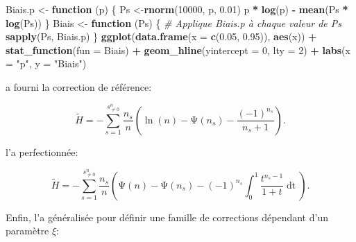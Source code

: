 \documentclass[
  11pt,
  french,
  a4paper,
  extrafontsizes,onecolumn,openright
  ]{memoir}
\newenvironment{Shaded}{\begin{snugshade}}{\end{snugshade}}
\newcommand{\AttributeTok}[1]{\textcolor[rgb]{0.13,0.29,0.53}{#1}}
\newcommand{\CommentTok}[1]{\textcolor[rgb]{0.56,0.35,0.01}{\textit{#1}}}
\newcommand{\ControlFlowTok}[1]{\textcolor[rgb]{0.13,0.29,0.53}{\textbf{#1}}}
\newcommand{\DecValTok}[1]{\textcolor[rgb]{0.00,0.00,0.81}{#1}}
\newcommand{\FloatTok}[1]{\textcolor[rgb]{0.00,0.00,0.81}{#1}}
\newcommand{\FunctionTok}[1]{\textcolor[rgb]{0.13,0.29,0.53}{\textbf{#1}}}
\newcommand{\NormalTok}[1]{#1}
\newcommand{\OtherTok}[1]{\textcolor[rgb]{0.56,0.35,0.01}{#1}}
\newcommand{\SpecialCharTok}[1]{\textcolor[rgb]{0.81,0.36,0.00}{\textbf{#1}}}
\newcommand{\StringTok}[1]{\textcolor[rgb]{0.31,0.60,0.02}{#1}}
\newlength{\rf}
\begin{document}
\begin{Shaded}
\begin{Highlighting}[]
\NormalTok{Biais.p }\OtherTok{\textless{}{-}} \ControlFlowTok{function}\NormalTok{ (p) \{}
\NormalTok{    Ps }\OtherTok{\textless{}{-}}\FunctionTok{rnorm}\NormalTok{(}\DecValTok{10000}\NormalTok{, p, }\FloatTok{0.01}\NormalTok{)}
\NormalTok{    p }\SpecialCharTok{*} \FunctionTok{log}\NormalTok{(p) }\SpecialCharTok{{-}} \FunctionTok{mean}\NormalTok{(Ps }\SpecialCharTok{*} \FunctionTok{log}\NormalTok{(Ps))}
\NormalTok{  \}}
\NormalTok{  Biais }\OtherTok{\textless{}{-}} \ControlFlowTok{function}\NormalTok{ (Ps) \{}
    \CommentTok{\# Applique Biais.p à chaque valeur de Ps}
    \FunctionTok{sapply}\NormalTok{(Ps, Biais.p)}
\NormalTok{  \}}
  \FunctionTok{ggplot}\NormalTok{(}\FunctionTok{data.frame}\NormalTok{(}\AttributeTok{x =} \FunctionTok{c}\NormalTok{(}\FloatTok{0.05}\NormalTok{, }\FloatTok{0.95}\NormalTok{)), }\FunctionTok{aes}\NormalTok{(x)) }\SpecialCharTok{+} 
    \FunctionTok{stat\_function}\NormalTok{(}\AttributeTok{fun =}\NormalTok{ Biais) }\SpecialCharTok{+}
    \FunctionTok{geom\_hline}\NormalTok{(}\AttributeTok{yintercept =} \DecValTok{0}\NormalTok{, }\AttributeTok{lty =} \DecValTok{2}\NormalTok{) }\SpecialCharTok{+}
    \FunctionTok{labs}\NormalTok{(}\AttributeTok{x =} \StringTok{"p"}\NormalTok{, }\AttributeTok{y =} \StringTok{"Biais"}\NormalTok{)}
\end{Highlighting}
\end{Shaded}

\normalsize

\textcite{Grassberger1988} a fourni la correction de référence:

\begin{equation}
  \label{eq:Grassberger1988}
  \tilde{H}
  = -\sum^{s^{n}_{\ne 0}}_{s=1}
  {\frac{n_s}{n}\left(\ln\left(n\right)-\mathrm{\Psi}\left(n_s\right)-\frac{{\left(-1\right)}^{n_s}}{n_s+1}\right)}.
\end{equation}

\textcite{Grassberger2003} l'a perfectionnée:

\begin{equation}
  \label{eq:Grassberger2003}
  \tilde{H} 
  = -\sum^{s^{n}_{\ne 0}}_{s=1}
    {\frac{n_s}{n} \left(\mathrm{\Psi}\left(n\right)-\mathrm{\Psi}\left(n_s\right)-{\left(-1\right)}^{n_s}\int^1_0{\frac{t^{n_s-1}}{1+t}\mathop{dt}}\right)}.
\end{equation}

Enfin, \textcite{Schurmann2004} l'a généralisée pour définir une famille de corrections dépendant d'un paramètre \(\xi\):
\end{document}
